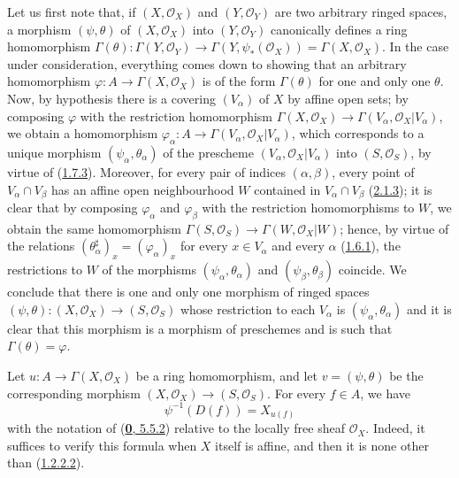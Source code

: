 Let us first note that, if $(X,\mathscr{O}_X)$ and $(Y,\mathscr{O}_Y)$ are
two arbitrary ringed spaces, a morphism $(\psi,\theta)$ of
$(X,\mathscr{O}_X)$ into $(Y,\mathscr{O}_Y)$ canonically defines a ring
homomorphism
$\Gamma(\theta):\Gamma(Y,\mathscr{O}_Y)\to
\Gamma(Y,\psi_*(\mathscr{O}_X))=\Gamma(X,\mathscr{O}_X)$. In the case under
consideration, everything comes down to showing that an arbitrary
homomorphism $\varphi:A\to\Gamma(X,\mathscr{O}_X)$ is of the form
$\Gamma(\theta)$ for one and only one $\theta$. Now, by hypothesis there is
a covering $(V_\alpha)$ of $X$ by affine open sets; by composing $\varphi$
with the restriction homomorphism
$\Gamma(X,\mathscr{O}_X)\to
\Gamma(V_\alpha,\mathscr{O}_X|V_\alpha)$, we obtain a homomorphism
$\varphi_\alpha:A\to\Gamma(V_\alpha,\mathscr{O}_X|V_\alpha)$, which
corresponds to a unique morphism $(\psi_\alpha,\theta_\alpha)$ of the
prescheme $(V_\alpha,\mathscr{O}_X|V_\alpha)$ into $(S,\mathscr{O}_S)$, by
virtue of (\hyperref[I.1.7.3]{1.7.3}). Moreover, for every pair of
indices $(\alpha,\beta)$, every point of $V_\alpha\cap V_\beta$ has an
affine open neighbourhood $W$ contained in $V_\alpha\cap V_\beta$
(\hyperref[I.2.1.3]{2.1.3}); it is clear that by composing
$\varphi_\alpha$ and $\varphi_\beta$ with the restriction homomorphisms to
$W$, we obtain the same homomorphism
$\Gamma(S,\mathscr{O}_S)\to\Gamma(W,\mathscr{O}_X|W)$; hence, by virtue of
the relations $(\theta_\alpha^\sharp)_x=(\varphi_\alpha)_x$ for every
$x\in V_\alpha$ and every $\alpha$ (\hyperref[I.1.6.1]{1.6.1}), the
restrictions to $W$ of the morphisms $(\psi_\alpha,\theta_\alpha)$ and
$(\psi_\beta,\theta_\beta)$ coincide. We conclude that there is one and only
one morphism of ringed spaces
$(\psi,\theta):(X,\mathscr{O}_X)\to(S,\mathscr{O}_S)$ whose
restriction to each $V_\alpha$ is $(\psi_\alpha,\theta_\alpha)$ and it is
clear that this morphism is a morphism of preschemes and is such that
$\Gamma(\theta)=\varphi$.

Let $u:A\to\Gamma(X,\mathscr{O}_X)$ be a ring homomorphism, and let
$v=(\psi,\theta)$ be the corresponding morphism
$(X,\mathscr{O}_X)\to(S,\mathscr{O}_S)$. For every $f\in A$, we have
\begin{equation}
  \psi^{-1}(D(f))=X_{u(f)}
  \tag{2.2.4.1}\label{I.2.2.4.1}
\end{equation}
with the notation of (\hyperref[0.5.5.2]{\textbf{0}, 5.5.2}) relative to the
locally free sheaf $\mathscr{O}_X$. Indeed, it suffices to verify this
formula when $X$ itself is affine, and then it is none other than
(\hyperref[I.1.2.2.2]{1.2.2.2}).

